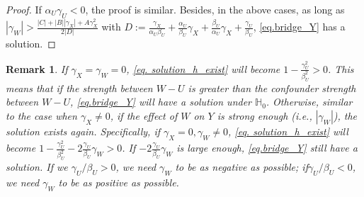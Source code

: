 \documentclass[
  12pt]{article}
\newtheorem{remark}{Remark}
\def\mH{\mathbb{H}}
\begin{document}
\begin{proof}
If $\alpha_U\gamma_U<0$, the proof is similar. Besides, in the above cases, as long as $|\gamma_W| >\frac{|C|+|B||\gamma_X|+A\gamma_X^2}{2|D|}$ with $D:=\frac{\gamma_X}{\alpha_U\beta_U}+\frac{\alpha_U}{\beta_U}\gamma_X+\frac{\beta_U}{\alpha_U}\gamma_X+\frac{\gamma_U}{\beta_U}$,  \eqref{eq.bridge_Y} has a solution. 
\end{proof}
\begin{remark}
If $\gamma_X=\gamma_W=0$,  \eqref{eq. solution_h_exist} will become $1-\frac{\gamma_{U}^{2}}{\beta_{U}^{2}}>0$. This means that if the strength between $W-U$ is greater than the confounder strength between $W-U$, \eqref{eq.bridge_Y} will have a solution under $\mH_0$. Otherwise, similar to the case when $\gamma_X \neq 0$, if the effect of $W$ on $Y$ is strong enough (\emph{i.e.}, $|\gamma_W|$), the solution exists again. Specifically, if $\gamma_X=0,\gamma_W\ne0$,  \eqref{eq. solution_h_exist} will become $1-\frac{\gamma_{U}^{2}}{\beta_{U}^{2}}-2\frac{\gamma_U}{\beta_U}\gamma_W>0$. If $-2\frac{\gamma_U}{\beta_U}\gamma_W$ is large enough, \eqref{eq.bridge_Y} still have a solution. If we $\gamma_U/\beta_U>0$, we need $\gamma_W$ to be as negative as possible; if$\gamma_U/\beta_U<0$, we need $\gamma_W$ to be as positive as possible.
\end{remark}
\end{document}
